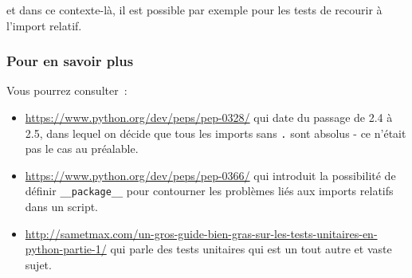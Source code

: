 et dans ce contexte-là, il est possible par exemple pour les tests de
recourir à l'import relatif.

    \hypertarget{pour-en-savoir-plus}{%
\subsubsection{Pour en savoir plus}\label{pour-en-savoir-plus}}

    Vous pourrez consulter~:

\begin{itemize}
\tightlist
\item
  \url{https://www.python.org/dev/peps/pep-0328/} qui date du passage de
  2.4 à 2.5, dans lequel on décide que tous les imports sans \texttt{.}
  sont absolus - ce n'était pas le cas au préalable.
\item
  \url{https://www.python.org/dev/peps/pep-0366/} qui introduit la
  possibilité de définir \texttt{\_\_package\_\_} pour contourner les
  problèmes liés aux imports relatifs dans un script.
\item
  \url{http://sametmax.com/un-gros-guide-bien-gras-sur-les-tests-unitaires-en-python-partie-1/}
  qui parle des tests unitaires qui est un tout autre et vaste sujet.
\end{itemize}


    
    
    
